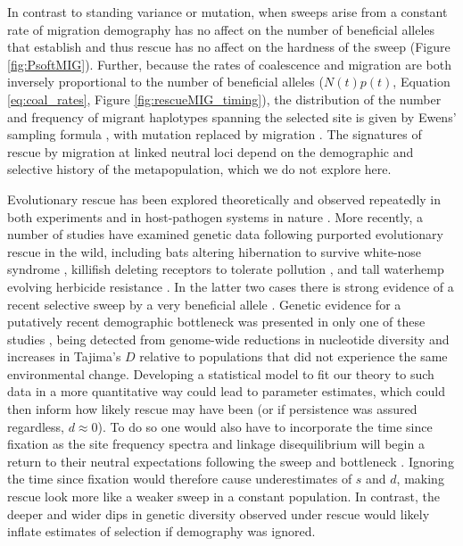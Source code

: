 \documentclass[]{article}
\begin{document}
In contrast to standing variance or mutation, when sweeps arise from a constant rate of migration demography has no affect on the number of beneficial alleles that establish \citep[as briefly noted by][]{pennings2006soft2} and thus rescue has no affect on the hardness of the sweep (Figure \ref{fig:PsoftMIG}). 
Further, because the rates of coalescence and migration are both inversely proportional to the number of beneficial alleles ($N(t) p(t)$, Equation \ref{eq:coal_rates}, Figure \ref{fig:rescueMIG_timing}), the distribution of the number and frequency of migrant haplotypes spanning the selected site is given by Ewens' sampling formula \citep{ewens1972sampling}, with mutation replaced by migration \citep{pennings2006soft2}.
The signatures of rescue by migration at linked neutral loci depend on the demographic and selective history of the metapopulation, which we do not explore here.

Evolutionary rescue has been explored theoretically \citep[e.g.,][]{gomulkiewicz1995does,uecker2016role,anciaux2018evolutionary} and observed repeatedly in both experiments \citep[e.g.,][]{bell2009evolutionary,lindsey2013evolutionary,ramsayer2013evolutionary} and in host-pathogen systems in nature \citep[e.,g.,][]{wei1995viral,feder2016more}.
More recently, a number of studies have examined genetic data following purported evolutionary rescue in the wild, including bats altering hibernation to survive white-nose syndrome \citep{gignoux2018genomic}, killifish deleting receptors to tolerate pollution \citep{oziolor2019adaptive}, and tall waterhemp evolving herbicide resistance \citep{kreiner2019multiple}.
In the latter two cases there is strong evidence of a recent selective sweep by a very beneficial allele \citep[in one of these cases the evidence includes reduced nucleotide diversity at the selected site;][]{kreiner2019multiple}.
Genetic evidence for a putatively recent demographic bottleneck was presented in only one of these studies \citep{oziolor2019adaptive}, being detected from genome-wide reductions in nucleotide diversity and increases in Tajima's $D$ relative to populations that did not experience the same environmental change.
Developing a statistical model to fit our theory to such data in a more quantitative way could lead to parameter estimates, which could then inform how likely rescue may have been (or if persistence was assured regardless, $d\approx0$).
To do so one would also have to incorporate the time since fixation as the site frequency spectra and linkage disequilibrium will begin a return to their neutral expectations following the sweep and bottleneck \citep[e.g., the sweep signatures in Tajima's $D$ and linkage disequilibrium decay within $\sim2N_e$ generations;][]{przeworski2002signature}.
Ignoring the time since fixation would therefore cause underestimates of $s$ and $d$, making rescue look more like a weaker sweep in a constant population.
In contrast, the deeper and wider dips in genetic diversity observed under rescue would likely inflate estimates of selection if demography was ignored.
\end{document}
